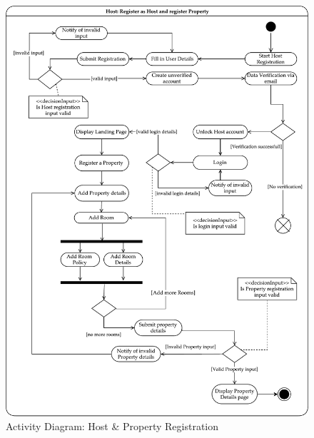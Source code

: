 \begin{figure}[H]
    \centering
    \includegraphics[width=17cm]{img/activity/register_property.pdf}
    \caption{Activity Diagram: Host \& Property Registration}
    \label{activity_diagram_1}
\end{figure}

